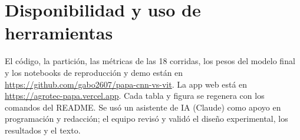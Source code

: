 \documentclass[conference,a4paper]{IEEEtran}
\begin{document}
\section*{Disponibilidad y uso de herramientas}
El código, la partición, las métricas de las 18 corridas, los pesos del modelo final y los notebooks de reproducción y demo están en \url{https://github.com/gabo2607/papa-cnn-vs-vit}. La app web está en \url{https://agrotec-papa.vercel.app}. Cada tabla y figura se regenera con los comandos del README. Se usó un asistente de IA (Claude) como apoyo en programación y redacción; el equipo revisó y validó el diseño experimental, los resultados y el texto.



\end{document}
